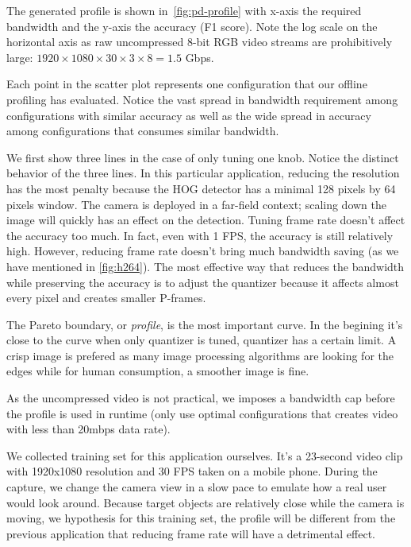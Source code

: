 The generated profile is shown in~\autoref{fig:pd-profile} with x-axis the
required bandwidth and the y-axis the accuracy (F1 score). Note the log scale on
the horizontal axis as raw uncompressed 8-bit RGB video streams are
prohibitively large: $1920 \times 1080 \times 30 \times 3 \times 8 = 1.5 $ Gbps.

Each point in the scatter plot represents one configuration that our offline
profiling has evaluated. Notice the vast spread in bandwidth requirement among
configurations with similar accuracy as well as the wide spread in accuracy
among configurations that consumes similar bandwidth.

We first show three lines in the case of only tuning one knob. Notice the
distinct behavior of the three lines. In this particular application, reducing
the resolution has the most penalty because the HOG detector has a minimal 128
pixels by 64 pixels window. The camera is deployed in a far-field context;
scaling down the image will quickly has an effect on the detection. Tuning frame
rate doesn't affect the accuracy too much. In fact, even with 1 FPS, the
accuracy is still relatively high. However, reducing frame rate doesn't bring
much bandwidth saving (as we have mentioned in \autoref{fig:h264}).  The most
effective way that reduces the bandwidth while preserving the accuracy is to
adjust the quantizer because it affects almost every pixel and creates smaller
P-frames.

The Pareto boundary, or \textit{profile}, is the most important curve. In the
begining it's close to the curve when only quantizer is tuned, quantizer has a
certain limit. A crisp image is prefered as many image processing algorithms are
looking for the edges while for human consumption, a smoother image is fine.

As the uncompressed video is not practical, we imposes a bandwidth cap before
the profile is used in runtime (only use optimal configurations that creates
video with less than 20mbps data rate).

 We collected training set for this application
ourselves. It's a 23-second video clip with 1920x1080 resolution and 30 FPS
taken on a mobile phone. During the capture, we change the camera view in a slow
pace to emulate how a real user would look around. Because target objects are
relatively close while the camera is moving, we hypothesis for this training
set, the profile will be different from the previous application that reducing
frame rate will have a detrimental effect.

